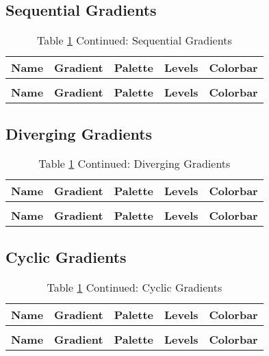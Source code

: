 \documentclass[a4paper]{article}
\begin{document}
\subsection{Sequential Gradients}
\renewcommand{\arraystretch}{2}
\begin{longtable}{p{}p{}p{}p{}p{}}
	\caption{Sequential Gradients} \label{tab:seq}                                             \\
	\hline
	\textbf{Name} & \textbf{Gradient} & \textbf{Palette} & \textbf{Levels} & \textbf{Colorbar} \\ \hline \endfirsthead
	\caption*{Table \ref{tab:seq} Continued: Sequential Gradients}                             \\
	\hline
	\textbf{Name} & \textbf{Gradient} & \textbf{Palette} & \textbf{Levels} & \textbf{Colorbar} \\ \hline \endhead
	
\end{longtable}
\newpage
\subsection{Diverging Gradients}
\renewcommand{\arraystretch}{2}
\begin{longtable}{p{}p{}p{}p{}p{}}
	\caption{Diverging Gradients} \label{tab:div}                                              \\
	\hline
	\textbf{Name} & \textbf{Gradient} & \textbf{Palette} & \textbf{Levels} & \textbf{Colorbar} \\ \hline \endfirsthead
	\caption*{Table \ref{tab:seq} Continued: Diverging Gradients}                              \\
	\hline
	\textbf{Name} & \textbf{Gradient} & \textbf{Palette} & \textbf{Levels} & \textbf{Colorbar} \\ \hline \endhead
	
\end{longtable}
\newpage
\subsection{Cyclic Gradients}
\renewcommand{\arraystretch}{2}
\begin{longtable}{p{}p{}p{}p{}p{}}
	\caption{Cyclic Gradients} \label{tab:cyc}                                                 \\
	\hline
	\textbf{Name} & \textbf{Gradient} & \textbf{Palette} & \textbf{Levels} & \textbf{Colorbar} \\ \hline \endfirsthead
	\caption*{Table \ref{tab:seq} Continued: Cyclic Gradients}                                 \\
	\hline
	\textbf{Name} & \textbf{Gradient} & \textbf{Palette} & \textbf{Levels} & \textbf{Colorbar} \\ \hline \endhead
	
\end{longtable}
\newpage
\end{document}
